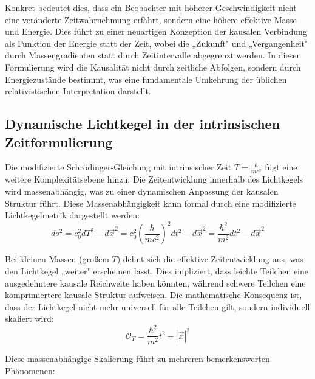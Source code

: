 \documentclass[a4paper,12pt]{article}
\begin{document}
	Konkret bedeutet dies, dass ein Beobachter mit höherer Geschwindigkeit nicht eine veränderte Zeitwahrnehmung erfährt, sondern eine höhere effektive Masse und Energie. Dies führt zu einer neuartigen Konzeption der kausalen Verbindung als Funktion der Energie statt der Zeit, wobei die „Zukunft" und „Vergangenheit" durch Massengradienten statt durch Zeitintervalle abgegrenzt werden. In dieser Formulierung wird die Kausalität nicht durch zeitliche Abfolgen, sondern durch Energiezustände bestimmt, was eine fundamentale Umkehrung der üblichen relativistischen Interpretation darstellt.
	
	\subsection{Dynamische Lichtkegel in der intrinsischen Zeitformulierung}
	Die modifizierte Schrödinger-Gleichung mit intrinsischer Zeit \( T = \frac{\hbar}{m c^2} \) fügt eine weitere Komplexitätsebene hinzu: Die Zeitentwicklung innerhalb des Lichtkegels wird massenabhängig, was zu einer dynamischen Anpassung der kausalen Struktur führt. Diese Massenabhängigkeit kann formal durch eine modifizierte Lichtkegelmetrik dargestellt werden:
	\begin{equation}
		ds^2 = c_0^2 dT^2 - d\vec{x}^2 = c_0^2 \left(\frac{\hbar}{m c^2}\right)^2 dt^2 - d\vec{x}^2 = \frac{\hbar^2}{m^2} dt^2 - d\vec{x}^2
	\end{equation}
	
	Bei kleinen Massen (großem \( T \)) dehnt sich die effektive Zeitentwicklung aus, was den Lichtkegel „weiter" erscheinen lässt. Dies impliziert, dass leichte Teilchen eine ausgedehntere kausale Reichweite haben könnten, während schwere Teilchen eine komprimiertere kausale Struktur aufweisen. Die mathematische Konsequenz ist, dass der Lichtkegel nicht mehr universell für alle Teilchen gilt, sondern individuell skaliert wird:
	\begin{equation}
		\mathcal{O}_T = \frac{\hbar^2}{m^2} t^2 - |\vec{x}|^2
	\end{equation}
	
	Diese massenabhängige Skalierung führt zu mehreren bemerkenswerten Phänomenen:
	
\end{document}
